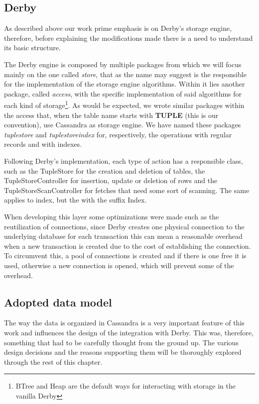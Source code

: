 \subsection{Derby}
\label{sec:patch}

As described above our work prime emphasis is on Derby's storage engine, therefore, before explaining the modifications made there is a need to understand its basic structure.

The Derby engine is composed by multiple packages from which we will focus mainly on the one called \emph{store}, that as the name may suggest is the responsible for the implementation of the storage engine algorithms. Within it lies another package, called \emph{access}, with the specific implementation of said algorithms for each kind of storage\footnote{BTree and Heap are the default ways for interacting with storage in the vanilla Derby}. As would be expected, we wrote similar packages within the access that, when the table name starts with \textbf{TUPLE} (this is our convention), use Cassandra as storage engine. We have named these packages \emph{tuplestore} and \emph{tuplestoreindex} for, respectively, the operations with regular records and with indexes.    

Following Derby's implementation, each type of action has a responsible class, such as the TupleStore for the creation and deletion of tables, the TupleStoreController for insertion, update or deletion of rows and the TupleStoreScanController for fetches that need some sort of scanning. The same applies to index, but the with the suffix Index.

When developing this layer some optimizations were made such as the reutilization of connections, since Derby creates one physical connection to the underlying database for each transaction this can mean a reasonable overhead when a new transaction is created due to the cost of establishing the connection. To circumvent this, a pool of connections is created and if there is one free it is used, otherwise a new connection is opened, which will prevent some of the overhead. 

\subsection{Adopted data model}
\label{sec:data_model}
The way the data is organized in Cassandra is a very important feature of this work and influences the design of the integration with Derby. This was, therefore, something that had to be carefully thought from the ground up. The various design decisions and the reasons supporting them will be thoroughly explored through the rest of this chapter.

